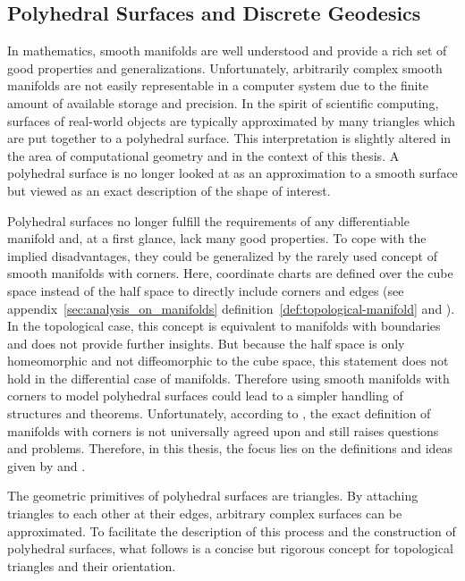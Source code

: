 \documentclass{stdlocal}
\begin{document}

\subsection{Polyhedral Surfaces and Discrete Geodesics} %
\label{sub:polyhedral_surfaces}

  In mathematics, smooth manifolds are well understood and provide a rich set of good properties and generalizations.
  Unfortunately, arbitrarily complex smooth manifolds are not easily representable in a computer system due to the finite amount of available storage and precision.
  In the spirit of scientific computing, surfaces of real-world objects are typically approximated by many triangles which are put together to a polyhedral surface.
  This interpretation is slightly altered in the area of computational geometry and in the context of this thesis.
  A polyhedral surface is no longer looked at as an approximation to a smooth surface but viewed as an exact description of the shape of interest.
  \autocite{sharp2020}

  Polyhedral surfaces no longer fulfill the requirements of any differentiable manifold and, at a first glance, lack many good properties.
  To cope with the implied disadvantages, they could be generalized by the rarely used concept of smooth manifolds with corners.
  Here, coordinate charts are defined over the cube space instead of the half space to directly include corners and edges (see appendix~\ref{sec:analysis_on_manifolds} definition~\ref{def:topological-manifold} and \textcite{joyce2009}).
  In the topological case, this concept is equivalent to manifolds with boundaries and does not provide further insights.
  But because the half space is only homeomorphic and not diffeomorphic to the cube space, this statement does not hold in the differential case of manifolds.
  Therefore using smooth manifolds with corners to model polyhedral surfaces could lead to a simpler handling of structures and theorems.
  Unfortunately, according to \textcite{joyce2009}, the exact definition of manifolds with corners is not universally agreed upon and still raises questions and problems.
  Therefore, in this thesis, the focus lies on the definitions and ideas given by \textcite{polthier2006} and \textcite{martinez2005}.

  The geometric primitives of polyhedral surfaces are triangles.
  By attaching triangles to each other at their edges, arbitrary complex surfaces can be approximated.
  To facilitate the description of this process and the construction of polyhedral surfaces, what follows is a concise but rigorous concept for topological triangles and their orientation.
\end{document}
